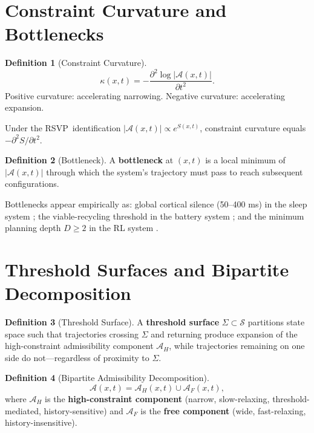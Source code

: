 \documentclass[12pt, a4paper, twoside]{book}
\theoremstyle{definition}
\newtheorem{definition}{Definition}[chapter]
\theoremstyle{remark}
\newcommand{\Adm}{\mathcal{A}}
\newcommand{\Spc}{\mathcal{S}}
\newcommand{\curv}{\kappa}
\newcommand{\term}[1]{\textbf{#1}}
\newcommand{\RSVP}{\textsf{RSVP}}
\begin{document}
\section{Constraint Curvature and Bottlenecks}

\begin{definition}[Constraint Curvature]
\begin{equation}
  \curv(x,t) = -\frac{\partial^2 \log |\Adm(x,t)|}{\partial t^2}.
\end{equation}
Positive curvature: accelerating narrowing. Negative curvature: accelerating expansion.
\end{definition}

Under the \RSVP\ identification $|\Adm(x,t)| \propto e^{S(x,t)}$, constraint curvature equals $-\partial^2 S/\partial t^2$.

\begin{definition}[Bottleneck]
A \term{bottleneck} at $(x,t)$ is a local minimum of $|\Adm(x,t)|$ through which the system's trajectory must pass to reach subsequent configurations.
\end{definition}

Bottlenecks appear empirically as: global cortical silence (50--400 ms) in the sleep system \citep{driessen2026}; the viable-recycling threshold in the battery system \citep{tian2026}; and the minimum planning depth $D \geq 2$ in the RL system \citep{okitsu2026}.

\section{Threshold Surfaces and Bipartite Decomposition}

\begin{definition}[Threshold Surface]
A \term{threshold surface} $\Sigma \subset \Spc$ partitions state space such that trajectories crossing $\Sigma$ and returning produce expansion of the high-constraint admissibility component $\Adm_H$, while trajectories remaining on one side do not---regardless of proximity to $\Sigma$.
\end{definition}

\begin{definition}[Bipartite Admissibility Decomposition]
\begin{equation}
  \Adm(x,t) = \Adm_H(x,t) \cup \Adm_F(x,t),
\end{equation}
where $\Adm_H$ is the \term{high-constraint component} (narrow, slow-relaxing, threshold-mediated, history-sensitive) and $\Adm_F$ is the \term{free component} (wide, fast-relaxing, history-insensitive).
\end{definition}
\end{document}
